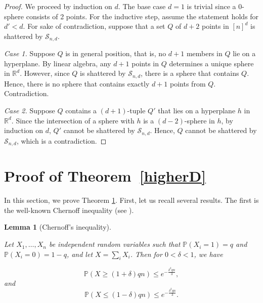 \documentclass[11pt]{article}
\theoremstyle{plain}
\newtheorem{lemma}[theorem]{Lemma}
\theoremstyle{definition}
\theoremstyle{remark}
\begin{document}
\begin{proof}
We proceed by induction on $d$.  The base case $d = 1$ is trivial since a 0-sphere consists of 2 points.  For the inductive step, assume the statement holds for $d' < d$.  For sake of contradiction, suppose that a set $Q$ of $d+2$ points in $[n]^d$ is shattered by $\mathcal{S}_{n,d}$. 

\medskip


\noindent \emph{Case 1.}  Suppose $Q$ is in general position, that is, no $d+1$ members in $Q$ lie on a hyperplane.  By linear algebra, any $d+1$ points in $Q$ determines a unique sphere in $\mathbb{R}^d$. 
 However, since $Q$ is shattered by $\mathcal{S}_{n,d}$, there is a sphere that contains $Q$.  Hence, there is no sphere that contains exactly $d + 1$ points from $Q$.  Contradiction.

 \medskip
\noindent \emph{Case 2.}  Suppose $Q$ contains a $(d+1)$-tuple $Q'$ that lies on a hyperplane $h$ in $\mathbb{R}^d$.  Since the intersection of a sphere with $h$ is a $(d-2)$-sphere in $h$, by induction on $d$, $Q'$ cannot be shattered by $\mathcal{S}_{n,d}$.  Hence, $Q$ cannot be shattered by  $\mathcal{S}_{n,d}$, which is a contradiction. \end{proof}







\section{Proof of Theorem~\ref{higherD}} \label{proofhigherD}
 
In this section, we prove Theorem \ref{proofhigherD}.  First, let us recall several results.  The first is the well-known Chernoff inequality (see \cite[Theorem 2.8]{janson}).


\begin{lemma}[Chernoff's inequality]\label{chernoff}

    Let $X_1,\ldots, X_n$ be independent random variables such that $\mathbb{P}(X_i = 1) = q$ and $\mathbb{P}(X_i = 0) = 1-q$, and let $X = \sum_i X_i$. Then for $0 < \delta < 1$, we have

$$\mathbb{P}(X \geq (1 + \delta)qn) \leq e^{-\frac{\delta^2qn}{3}},$$and
$$\mathbb{P}(X \leq (1 - \delta)qn) \leq e^{-\frac{\delta^2qn}{3}}.$$


    
\end{lemma}
\end{document}
